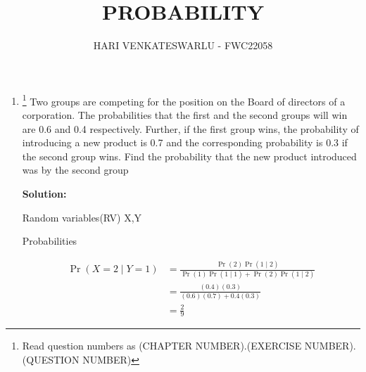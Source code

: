 \documentclass{article}
\providecommand{\pr}[1]{\ensuremath{\Pr\left(#1\right)}}
\newcommand{\solution}{\noindent \textbf{Solution: }}
\providecommand{\pr}[1]{\ensuremath{\Pr\left(#1\right)}}
\begin{document}
\title{PROBABILITY}
\author{\Large HARI VENKATESWARLU - FWC22058}
\date{}

\maketitle

\begin{enumerate}[label=13.\arabic{enumi}.\arabic{enumii}]%
\setcounter{enumi}{0}
\setcounter{enumii}{11}

\item \footnote{Read question numbers as (CHAPTER NUMBER).(EXERCISE NUMBER).(QUESTION NUMBER)} {Two groups are competing for the position
on the Board of directors of a corporation.
The probabilities that the first and the second
groups will win are 0.6 and 0.4 respectively.
Further, if the first group wins, the probability
of introducing a new product is 0.7 and the
corresponding probability is 0.3 if the second
group wins. Find the probability that the new
product introduced was by the second group}

	\solution\\
	\begin{table}[h]\centering
	
	\caption{Random variables(RV) X,Y}%
\end{table}

    \begin{table}[h]\centering
	
	\caption{Probabilities}%
    \end{table}
\begin{align}
\pr{X=2 \mid Y=1} &= \frac{\pr{2}\pr{1 \mid 2}}{\pr{1}\pr{1 \mid 1}+\pr{2}\pr{1 \mid 2}}\\
&=\frac{(0.4)(0.3)}{(0.6)(0.7)+0.4(0.3)}\\
&=\frac{2}{9}
\end{align}
\end{enumerate}
\end{document}
